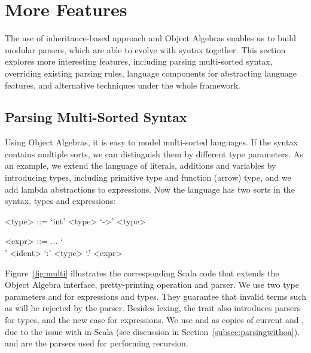 \section{More Features}

The use of inheritance-based approach and Object Algebras enables us
to build modular parsers, which are able to evolve with
syntax together. This section explores more interesting features, including
parsing multi-sorted syntax, overriding existing parsing rules,
language components for abstracting language features, and alternative
techniques under the whole framework.

\subsection{Parsing Multi-Sorted Syntax}\label{subsec:differentsyntax}

\begin{comment}
As illustrated above, using Object Algebras separates data structures from behaviors, thus enabling more modularity and reuse. New language constructs correspond to the new cases in the algebra. Different operations
 on structures, with both code reuse and separate compilation supported.
\end{comment}

Using Object Algebras, it is easy to
model multi-sorted languages. If the syntax contains multiple sorts, we can distinguish them by different type parameters. As an example, we extend the language of literals, additions and variables by introducing types, including primitive type  and function (arrow) type, and we add lambda abstractions to expressions. Now the language has two sorts in the syntax, types and expressions:

\setlength{\grammarindent}{5em}
\begin{grammar}
<type> ::= `int' \alt <type> `->' <type>

<expr> ::=  ... \alt `\\' <ident> `:' <type> `.' <expr>
\end{grammar}

Figure~\ref{fig:multi} illustrates the corresponding Scala code
that extends the Object Algebra interface, pretty-printing operation and parser. We use two type parameters  and  for expressions and types. They guarantee that invalid terms such as  will be rejected by the parser.
Besides lexing, the trait  also introduces parsers for types, and the new case for expressions.
We use  and  as copies of current  and , due to the issue
with  in Scala (see discussion in Section~\ref{subsec:parsingwithoa}).  and  are the parsers used for performing recursion.

